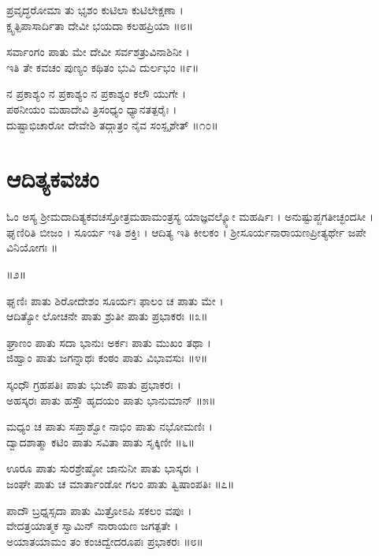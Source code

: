 ಪ್ರವೃದ್ಧರೋಮಾ ತು ಭೃಶಂ ಕುಟಿಲಾ ಕುಟಿಲೇಕ್ಷಣಾ ।\\
ಕ್ಷೃತ್ಪಿಪಾಸಾರ್ದಿತಾ ದೇವೀ ಭಯದಾ ಕಲಹಪ್ರಿಯಾ ॥೮॥

ಸರ್ವಾಂಗಂ ಪಾತು ಮೇ ದೇವೀ ಸರ್ವಶತ್ರುವಿನಾಶಿನೀ ।\\
ಇತಿ ತೇ ಕವಚಂ ಪುಣ್ಯಂ ಕಥಿತಂ ಭುವಿ ದುರ್ಲಭಂ ॥೯॥

ನ ಪ್ರಕಾಶ್ಯಂ ನ ಪ್ರಕಾಶ್ಯಂ ನ ಪ್ರಕಾಶ್ಯಂ ಕಲೌ ಯುಗೇ ।\\
ಪಠನೀಯಂ ಮಹಾದೇವಿ ತ್ರಿಸಂಧ್ಯಂ ಧ್ಯಾನತತ್ಪರೈಃ ।\\
ದುಷ್ಟಾಭಿಚಾರೋ ದೇವೇಶಿ ತದ್ಗಾತ್ರಂ ನೈವ ಸಂಸ್ಪೃಶೇತ್ ॥೧೦॥



\section{ಆದಿತ್ಯಕವಚಂ}

ಓಂ ಅಸ್ಯ ಶ್ರೀಮದಾದಿತ್ಯಕವಚಸ್ತೋತ್ರಮಹಾಮಂತ್ರಸ್ಯ ಯಾಜ್ಞವಲ್ಕ್ಯೋ ಮಹರ್ಷಿಃ । ಅನುಷ್ಟುಪ್ಜಗತೀಚ್ಛಂದಸೀ । ಘೃಣಿರಿತಿ ಬೀಜಂ । ಸೂರ್ಯ ಇತಿ ಶಕ್ತಿಃ । ಆದಿತ್ಯ ಇತಿ ಕೀಲಕಂ । ಶ್ರೀಸೂರ್ಯನಾರಾಯಣಪ್ರೀತ್ಯರ್ಥೇ ಜಪೇ ವಿನಿಯೋಗಃ ॥

॥೨॥

ಘೃಣಿಃ ಪಾತು ಶಿರೋದೇಶಂ ಸೂರ್ಯಃ ಫಾಲಂ ಚ ಪಾತು ಮೇ ।\\
ಆದಿತ್ಯೋ ಲೋಚನೇ ಪಾತು ಶ್ರುತೀ ಪಾತು ಪ್ರಭಾಕರಃ ॥೩॥

ಘ್ರಾಣಂ ಪಾತು ಸದಾ ಭಾನುಃ ಅರ್ಕಃ ಪಾತು ಮುಖಂ ತಥಾ ।\\
ಜಿಹ್ವಾಂ ಪಾತು ಜಗನ್ನಾಥಃ ಕಂಠಂ ಪಾತು ವಿಭಾವಸುಃ ॥೪॥

ಸ್ಕಂಧೌ ಗ್ರಹಪತಿಃ ಪಾತು ಭುಜೌ ಪಾತು ಪ್ರಭಾಕರಃ ।\\
ಅಹಸ್ಕರಃ ಪಾತು ಹಸ್ತೌ ಹೃದಯಂ ಪಾತು ಭಾನುಮಾನ್ ॥೫॥

ಮಧ್ಯಂ ಚ ಪಾತು ಸಪ್ತಾಶ್ವೋ ನಾಭಿಂ ಪಾತು ನಭೋಮಣಿಃ ।\\
ದ್ವಾದಶಾತ್ಮಾ ಕಟಿಂ ಪಾತು ಸವಿತಾ ಪಾತು ಸೃಕ್ಕಿಣೀ ॥೬॥

ಊರೂ ಪಾತು ಸುರಶ್ರೇಷ್ಠೋ ಜಾನುನೀ ಪಾತು ಭಾಸ್ಕರಃ ।\\
ಜಂಘೇ ಪಾತು ಚ ಮಾರ್ತಾಂಡೋ ಗಲಂ ಪಾತು ತ್ವಿಷಾಂಪತಿಃ ॥೭॥

ಪಾದೌ ಬ್ರಧ್ನಸ್ಸದಾ ಪಾತು ಮಿತ್ರೋಽಪಿ ಸಕಲಂ ವಪುಃ ।\\
ವೇದತ್ರಯಾತ್ಮಕ ಸ್ವಾಮಿನ್ ನಾರಾಯಣ ಜಗತ್ಪತೇ ।\\
ಅಯಾತಯಾಮಂ ತಂ ಕಂಚಿದ್ವೇದರೂಪಃ ಪ್ರಭಾಕರಃ ॥೮॥

